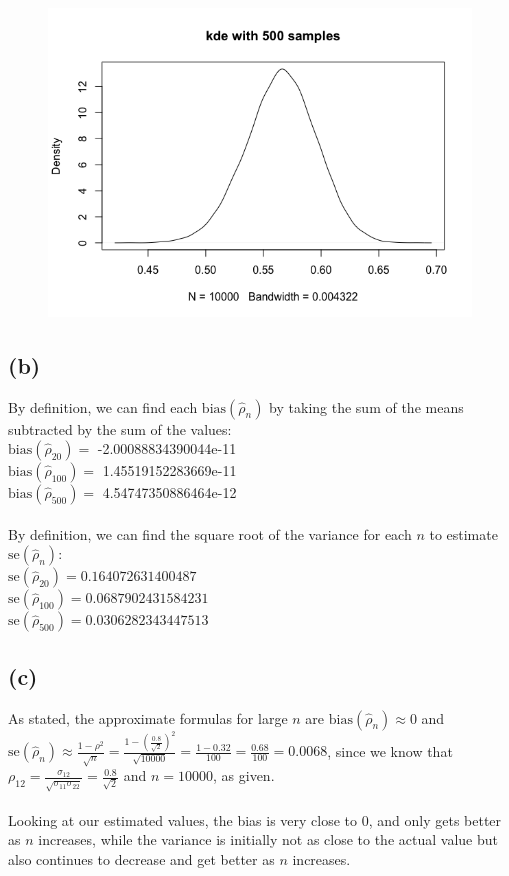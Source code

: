 \documentclass{article}
\begin{document}
{\begin{figure}[t!]
\end{figure}
\begin{figure}[t!]
  \centering
  \includegraphics[width=450pt]{hw5_2a_500.png}
\end{figure}
\newpage

\subsection*{(b)}

By definition, we can find each $\text{bias}(\hat{\rho}_n)$ by taking the sum of the means subtracted by the sum of the values: \\
$\text{bias}(\hat{\rho}_{20}) = 
$ -2.00088834390044e-11 \\
$\text{bias}(\hat{\rho}_{100}) = $ 1.45519152283669e-11 \\
$\text{bias}(\hat{\rho}_{500}) = $ 4.54747350886464e-12 \\ \\
By definition, we can find the square root of the variance for each $n$ to estimate $\text{se}(\hat{\rho}_n)$: \\
$\text{se}(\hat{\rho}_{20}) = 0.164072631400487$ \\
$\text{se}(\hat{\rho}_{100}) = 0.0687902431584231$ \\
$\text{se}(\hat{\rho}_{500}) = 0.0306282343447513$

\subsection*{(c)}

As stated, the approximate formulas for large $n$ are $\text{bias}(\hat{\rho}_n) \approx 0$ and $\text{se}(\hat{\rho}_n) \approx \frac{1-\rho^2}{\sqrt{n}} = \frac{1 - (\frac{0.8}{\sqrt{2}})^2}{\sqrt{10000}} = \frac{1 - 0.32}{100} = \frac{0.68}{100} = 0.0068$, since we know that $\rho_{12} = \frac{\sigma_{12}}{\sqrt{\sigma_{11}\sigma_{22}}} = \frac{0.8}{\sqrt{2}}$ and $n = 10000$, as given. \\ \\
Looking at our estimated values, the bias is very close to 0, and only gets better as $n$ increases, while the variance is initially not as close to the actual value but also continues to decrease and get better as $n$ increases.

}
\end{document}
